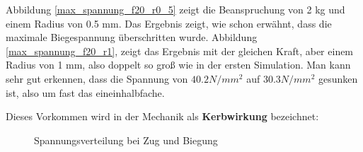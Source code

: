 	Abbildung \ref{max_spannung_f20_r0_5} zeigt die Beanspruchung von 2 kg und einem Radius von 0.5 mm.
	Das Ergebnis zeigt, wie schon erwähnt, dass die maximale Biegespannung überschritten wurde.
	Abbildung \ref{max_spannung_f20_r1}, zeigt das Ergebnis mit der gleichen Kraft, aber einem Radius von 1 mm, also doppelt so groß wie in der ersten Simulation.
	Man kann sehr gut erkennen, dass die Spannung von $40.2 N/mm^{2}$ auf $30.3 N/mm^{2}$ gesunken ist, also um fast das eineinhalbfache.

			\newpage

	Dieses Vorkommen wird in der Mechanik als \textbf{Kerbwirkung} bezeichnet:

			\begin{figure}[H]
				\begin{centering}
				\par\end{centering}
				\caption[Spannungsverteilung bei Zug und Biegung]{Spannungsverteilung bei Zug und Biegung\cite{spannungsverteilung}}
				\label{spannungsverteilung_ohne_und_mit_kerbe}
			\end{figure}

